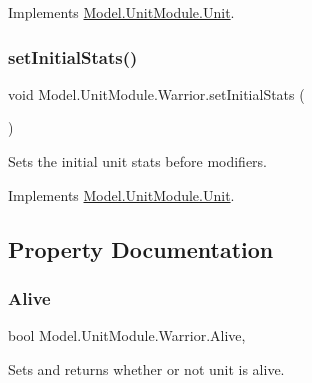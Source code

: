 Implements \hyperlink{interface_model_1_1_unit_module_1_1_unit_ad48776b3bd231bf80d2eec87b7498302}{Model.\+Unit\+Module.\+Unit}.

\hypertarget{class_model_1_1_unit_module_1_1_warrior_a3a55c013bad5ebd5f6e4402fc8b1f887}{}\label{class_model_1_1_unit_module_1_1_warrior_a3a55c013bad5ebd5f6e4402fc8b1f887} 
\subsubsection{\texorpdfstring{set\+Initial\+Stats()}{setInitialStats()}}
{\footnotesize\ttfamily void Model.\+Unit\+Module.\+Warrior.\+set\+Initial\+Stats (\begin{DoxyParamCaption}{ }\end{DoxyParamCaption})\hspace{0.3cm}{\ttfamily [inline]}}

Sets the initial unit stats before modifiers. 

Implements \hyperlink{interface_model_1_1_unit_module_1_1_unit_a3b67c1b9e929a9f7d4191de20996220a}{Model.\+Unit\+Module.\+Unit}.



\subsection{Property Documentation}
\hypertarget{class_model_1_1_unit_module_1_1_warrior_a3529dbe19047ce3959f02aa28a9aa578}{}\label{class_model_1_1_unit_module_1_1_warrior_a3529dbe19047ce3959f02aa28a9aa578} 
\subsubsection{\texorpdfstring{Alive}{Alive}}
{\footnotesize\ttfamily bool Model.\+Unit\+Module.\+Warrior.\+Alive\hspace{0.3cm}{\ttfamily [get]}, {\ttfamily [set]}}

Sets and returns whether or not unit is alive. \hypertarget{class_model_1_1_unit_module_1_1_warrior_a3f55509bf1b16090b81dce4b3be23f05}{}\label{class_model_1_1_unit_module_1_1_warrior_a3f55509bf1b16090b81dce4b3be23f05} 
